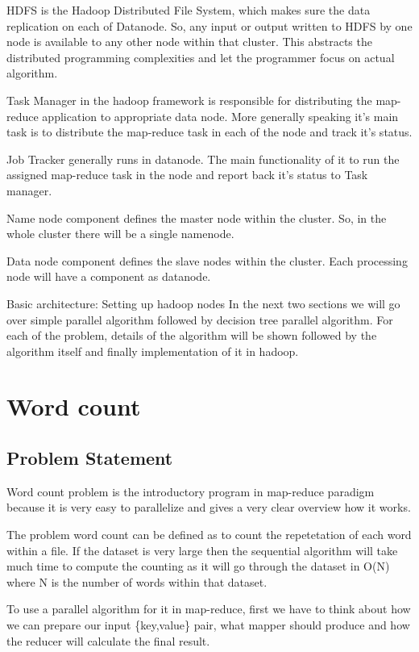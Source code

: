 \documentclass{article}
\begin{document}
HDFS is the Hadoop Distributed File System, which makes sure the data replication on each of Datanode. So, any input or output written to HDFS by one node is available to any other node within that cluster. This abstracts the distributed programming complexities and let the programmer focus on actual algorithm.

Task Manager in the hadoop framework is responsible for distributing the map-reduce application to appropriate data node. More generally speaking it’s main task is to distribute the map-reduce task in each of the node and track it’s status.

Job Tracker generally runs in datanode. The main functionality of it to run the assigned map-reduce task in the node and report back it’s status to Task manager.

Name node component defines the master node within the cluster. So, in the whole cluster there will be a single namenode.

Data node component defines the slave nodes within the cluster. Each processing node will have a component as datanode.

Basic architecture:
Setting up hadoop nodes
In the next two sections we will go over simple parallel algorithm followed by decision tree parallel algorithm. For each of the problem, details of the algorithm will be shown followed by the algorithm itself and finally implementation of it in hadoop.

\section{Word count}
\subsection{Problem Statement}
Word count problem is the introductory program in map-reduce paradigm because it is very easy to parallelize and gives a very clear overview how it works.

The problem word count can be defined as to count the repetetation of each word within a file. If the dataset is very large then the sequential algorithm will take much time to compute the counting as it will go through the dataset in O(N) where N is the number of words within that dataset.

To use a parallel algorithm for it in map-reduce, first we have to think about how we can prepare our input \{key,value\} pair, what mapper should produce and how the reducer will calculate the final result.
\end{document}
